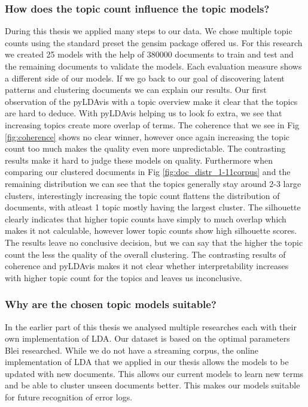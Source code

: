\subsubsection{How does the topic count influence the topic models?}
During this thesis we applied many steps to our data. We chose multiple topic counts using the standard preset the gensim package offered us. For this research we created 25 models with the help of 380000 documents to train and test and the remaining documents to validate the models. Each evaluation measure shows a different side of our models. If we go back to our goal of discovering latent patterns and clustering documents we can explain our results. Our first observation of the pyLDAvis with a topic overview make it clear that the topics are hard to deduce. With pyLDAvis helping us to look fo extra, we see that increasing topics create more overlap of terms. The coherence that we see in Fig \ref{fig:coherence} shows no clear winner, however once again increasing the topic count too much makes the quality even more unpredictable. The contrasting results make it hard to judge these models on quality. Furthermore when comparing our clustered documents in Fig \ref{fig:doc_distr_1-11corpus} and the remaining distribution we can see that the topics generally stay around 2-3 large clusters, interestingly increasing the topic count flattens the distribution of documents, with atleast 1 topic mostly having the largest cluster. The silhouette clearly indicates that higher topic counts have simply to much overlap which makes it not calculable, however lower topic counts show high silhouette scores. The results leave no conclusive decision, but we can say that the higher the topic count the less the quality of the overall clustering. The contrasting results of coherence and pyLDAvis makes it not clear whether interpretability increases with higher topic count for the topics and leaves us inconclusive.

\subsubsection{Why are the chosen topic models suitable?}
In the earlier part of this thesis we analysed multiple researches each with their own implementation of LDA. Our dataset is based on the optimal parameters Blei researched. While we do not have a streaming corpus, the online implementation of LDA that we applied in our thesis allows the models to be updated with new documents. This allows our current models to learn new terms and be able to cluster unseen documents better. This makes our models suitable for future recognition of error logs.
    
